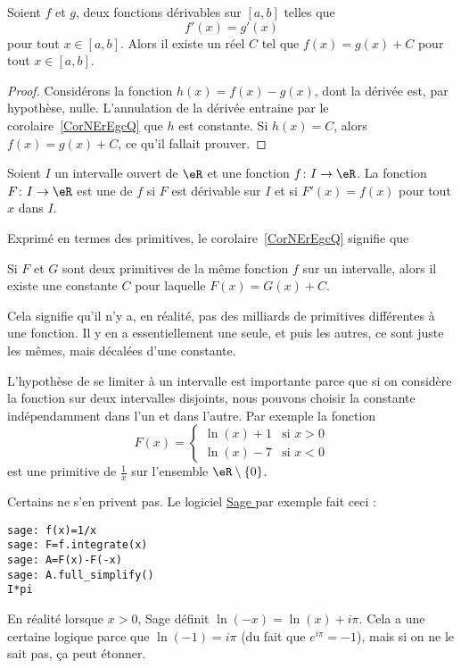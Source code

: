 \begin{corollary}   \label{CorNErEgcQ}
	Soient \( f\) et \( g\), deux fonctions dérivables sur \( [a,b]\) telles que
	\begin{equation}
		f'(x) = g'(x)
	\end{equation}
	pour tout \( x \in [a,b]\). Alors il existe un réel \( C\) tel que \( f (x) = g (x) + C\) pour tout \( x\in [a,b]\).
\end{corollary}

\begin{proof}
	Considérons la fonction \( h(x)=f(x)-g(x)\), dont la dérivée est, par hypothèse, nulle. L'annulation de la dérivée entraine par le corolaire~\ref{CorNErEgcQ} que \( h\) est  constante. Si \( h(x)=C\), alors \( f(x)=g(x)+C\), ce qu'il fallait prouver.
\end{proof}

\begin{definition}  \label{DefXVMVooWhsfuI}
	Soient \( I\) un intervalle ouvert de \( \eR\) et une fonction \( f\colon I\to \eR\). La fonction \( F\colon I\to \eR\) est une  de \( f\) si \( F\) est dérivable sur \( I\) et si \( F'(x)=f(x)\) pour tout \( x\) dans \( I\).
\end{definition}

Exprimé en termes des primitives, le corolaire~\ref{CorNErEgcQ} signifie que
\begin{corollary}  \label{CorZeroCst}
	Si \( F\) et \( G\) sont deux primitives de la même fonction \( f\) sur un intervalle, alors il existe une constante \( C\) pour laquelle \( F(x)=G(x)+C\).
\end{corollary}
Cela signifie qu'il n'y a, en réalité, pas des milliards de primitives différentes à une fonction. Il y en a essentiellement une seule, et puis les autres, ce sont juste les mêmes, mais décalées d'une constante.

\begin{remark}
	L'hypothèse de se limiter à un intervalle est importante parce que si on considère la fonction sur deux intervalles disjoints, nous pouvons choisir la constante indépendamment dans l'un et dans l'autre. Par exemple la fonction
	\begin{equation}
		F(x)=\begin{cases}
			\ln(x)+1 & \text{si } x>0 \\
			\ln(x)-7 & \text{si } x<0
		\end{cases}
	\end{equation}
	est une primitive de \( \frac{1}{ x }\) sur l'ensemble \( \eR\setminus\{ 0 \}\).

	Certains ne s'en privent pas. Le logiciel \href{https://www.sagemath.org}{ Sage } par exemple fait ceci :
	\begin{verbatim}
sage: f(x)=1/x
sage: F=f.integrate(x)
sage: A=F(x)-F(-x)
sage: A.full_simplify()
I*pi
    \end{verbatim}
	En réalité lorsque \( x>0\), Sage définit \( \ln(-x)=\ln(x)+i\pi\). Cela a une certaine logique parce que \( \ln(-1)=i\pi\) (du fait que \(  e^{i\pi}=-1\)), mais si on ne le sait pas, ça peut étonner.
\end{remark}

